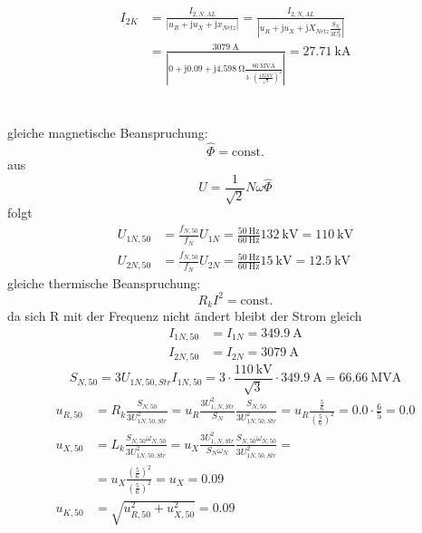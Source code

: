 \documentclass[11pt,a4paper]{scrartcl}
\newcommand{\mybr}[1]{\left(#1\right)}
\renewcommand{\j}{\mathrm{j}}
\newcommand{\0}{_{\mybr{0}}}
\newcommand{\1}{_{\mybr{1}}}
\newcommand{\2}{_{\mybr{2}}}
\newcommand{\UPNS}{U_{1,N,Str}}
\newcommand{\ISNA}{I_{2,N,AL}}
\begin{document}
\section{}
\begin{align}
I_{2K}&=\frac{\ISNA}{\left| u_R+\j u_X +\j x_{Netz}\right|}=\frac{\ISNA}{\left| u_R+\j u_X +\j X_{Netz}\frac{S_N}{3U_S^2}\right|}\\
&=\frac{\SI{3079}{\ampere}}{\left| \num{0}+\j\num{0.09}+\j\SI{4.598}{\ohm}\frac{\SI{80}{\mega\volt\ampere}}{3\cdot\mybr{\frac{\SI{132}{\kilo\volt}}{\sqrt{3}}}^2}\right|}=\SI{27.71}{\kilo\ampere}
\end{align}

\section{}
gleiche magnetische Beanspruchung:
\begin{equation}
\hat\Phi=\text{const.}
\end{equation}
aus
\begin{equation}
U=\frac{1}{\sqrt{2}}N\omega\hat\Phi
\end{equation}
folgt
\begin{align}
U_{1N,50}&=\frac{f_{N,50}}{f_{N}}U_{1N}=\frac{\SI{50}{\hertz}}{\SI{60}{\hertz}}\SI{132}{\kilo\volt}=\SI{110}{\kilo\volt}\\
U_{2N,50}&=\frac{f_{N,50}}{f_{N}}U_{2N}=\frac{\SI{50}{\hertz}}{\SI{60}{\hertz}}\SI{15}{\kilo\volt}=\SI{12.5}{\kilo\volt}
\end{align}
gleiche thermische Beanspruchung:
\begin{equation}
R_k I^2 = \text{const.}
\end{equation}
da sich R mit der Frequenz nicht ändert bleibt der Strom gleich
\begin{align}
I_{1N,50}&=I_{1N}=\SI{349.9}{\ampere}\\
I_{2N,50}&=I_{2N}=\SI{3079}{\ampere}
\end{align}
\begin{equation}
S_{N,50}=3U_{1N,50,Str}I_{1N,50}=3\cdot\frac{\SI{110}{\kilo\volt}}{\sqrt{3}}\cdot\SI{349.9}{\ampere}=\SI{66.66}{\mega\volt\ampere}
\end{equation}
\begin{align}
u_{R,50}&=R_k\frac{S_{N,50}}{3U_{1N,50,Str}^2}=u_R\frac{3\UPNS^2}{S_N}\frac{S_{N,50}}{3U_{1N,50,Str}^2}=u_R\frac{\frac{5}{6}}{\mybr{\frac{5}{6}}^2}=\num{0.0}\cdot\frac{6}{5}=\num{0.0}\\
u_{X,50}&=L_k\frac{S_{N,50}\omega_{N,50}}{3U_{1N,50,Str}^2}=u_X\frac{3\UPNS^2}{S_N\omega_N}\frac{S_{N,50}\omega_{N,50}}{3U_{1N,50,Str}^2}=\\
&=u_X\frac{\mybr{\frac{5}{6}}^2}{\mybr{\frac{5}{6}}^2}=u_X=\num{0.09}\\
u_{K,50}&=\sqrt{u_{R,50}^2+u_{X,50}^2}=0.09
\end{align}
\end{document}
